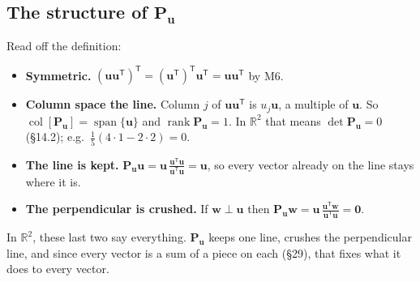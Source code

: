 \documentclass[11pt]{article}
\theoremstyle{plain}
\theoremstyle{definition}
\theoremstyle{remark}
\newcommand{\R}{\mathbb{R}}
\newcommand{\vc}[1]{\mathbf{#1}}
\newcommand{\mt}[1]{\mathbf{#1}}
\newcommand{\T}{^{\mathsf{T}}}
\newcommand{\colsp}[1]{\operatorname{col}[#1]}
\DeclareMathOperator{\spanop}{span}
\DeclareMathOperator{\rank}{rank}
\begin{document}
\begin{center}
\end{center}

\subsection{The structure of \texorpdfstring{$\mt{P}_{\vc{u}}$}{P\_u}}
Read off the definition:
\begin{itemize}[leftmargin=1.4em,itemsep=3pt]
  \item \textbf{Symmetric.} $(\vc{u}\vc{u}\T)\T=(\vc{u}\T)\T\vc{u}\T=\vc{u}\vc{u}\T$
        by M6.
  \item \textbf{Column space the line.} Column $j$ of $\vc{u}\vc{u}\T$ is
        $u_j\vc{u}$, a multiple of $\vc{u}$. So $\colsp{\mt{P}_{\vc{u}}}=\spanop\{\vc{u}\}$
        and $\rank\mt{P}_{\vc{u}}=1$. In $\R^{2}$ that means
        $\det\mt{P}_{\vc{u}}=0$ (\S14.2); e.g.\ $\frac15(4\cdot1-2\cdot2)=0$.
  \item \textbf{The line is kept.} $\mt{P}_{\vc{u}}\vc{u}=\vc{u}\,\frac{\vc{u}\T\vc{u}}{\vc{u}\T\vc{u}}=\vc{u}$,
        so every vector already on the line stays where it is.
  \item \textbf{The perpendicular is crushed.} If $\vc{w}\perp\vc{u}$ then
        $\mt{P}_{\vc{u}}\vc{w}=\vc{u}\,\frac{\vc{u}\T\vc{w}}{\vc{u}\T\vc{u}}=\vc{0}$.
\end{itemize}
In $\R^{2}$, these last two say everything. $\mt{P}_{\vc{u}}$ keeps one line,
crushes the perpendicular line, and since every vector is a sum of a piece on
each (\S29), that fixes what it does to every vector.
\end{document}
